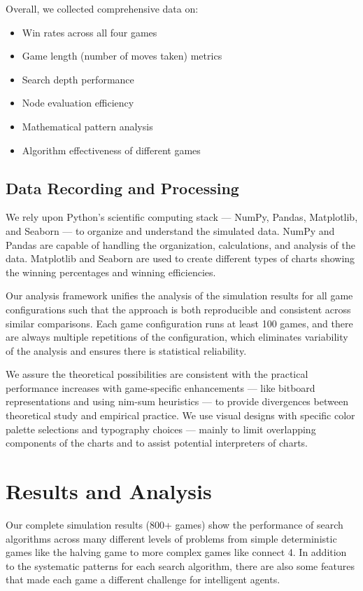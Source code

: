 \documentclass[12pt]{article}
\begin{document}
Overall, we collected comprehensive data on:
\begin{itemize}
    \item Win rates across all four games
    \item Game length (number of moves taken) metrics 
    \item Search depth performance
    \item Node evaluation efficiency
    \item Mathematical pattern analysis
    \item Algorithm effectiveness of different games
\end{itemize}

\subsection{Data Recording and Processing}

We rely upon Python's scientific computing stack — NumPy, Pandas, Matplotlib, and Seaborn — to organize and understand the simulated data. NumPy and Pandas are capable of handling the organization, calculations, and analysis of the data. Matplotlib and Seaborn are used to create different types of charts showing the winning percentages and winning efficiencies.

Our analysis framework unifies the analysis of the simulation results for all game configurations such that the approach is both reproducible and consistent across similar comparisons. Each game configuration runs at least 100 games, and there are always multiple repetitions of the configuration, which eliminates variability of the analysis and ensures there is statistical reliability.

We assure the theoretical possibilities are consistent with the practical performance increases with game-specific enhancements — like bitboard representations and using nim-sum heuristics — to provide divergences between theoretical study and empirical practice. We use visual designs with specific color palette selections and typography choices — mainly to limit overlapping components of the charts and to assist potential interpreters of charts.


\section{Results and Analysis}

Our complete simulation results (800+ games) show the performance of search algorithms across many different levels of problems from simple deterministic games like the halving game to more complex games like connect 4. In addition to the systematic patterns for each search algorithm, there are also some features that made each game a different challenge for intelligent agents.
\end{document}
